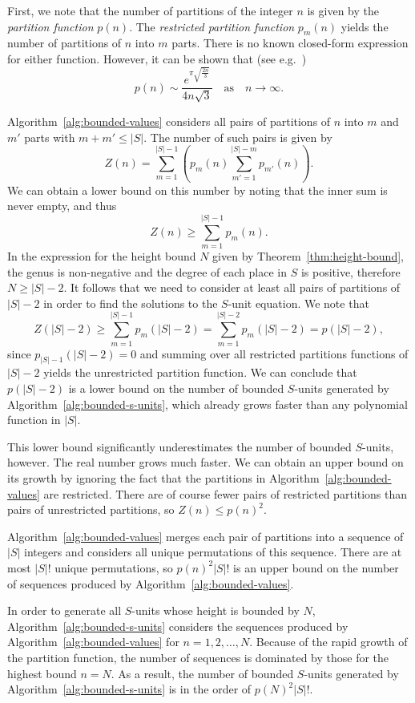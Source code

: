 First, we note that the number of partitions of the integer \(n\) is given by the \textit{partition function} \(p(n)\). The \textit{restricted partition function} \(p_{m}(n)\) yields the number of partitions of \(n\) into \(m\) parts. There is no known closed-form expression for either function. However, it can be shown that (see e.g.~\cite[Theorem 6.3]{andrews-1984-the-theory-of})
\[p(n) \sim \frac{e^{\pi\sqrt{\frac{2n}{3}}}}{4n\sqrt{3}} \quad \text{as} \quad n \to \infty.\]

Algorithm~\ref{alg:bounded-values} considers all pairs of partitions  of \(n\) into \(m\) and \(m'\) parts with \(m + m' \leq |S|\). The number of such pairs is given by
\[ Z(n) = \sum_{m = 1}^{|S| - 1} \left( p_{m}(n) \sum_{m' = 1}^{|S| - m} p_{m'}(n) \right).\]
We can obtain a lower bound on this number by noting that the inner sum is never empty, and thus
\[ Z(n) \geq \sum_{m = 1}^{|S| - 1} p_{m}(n).\]
In the expression for the height bound \(N\) given by Theorem~\ref{thm:height-bound}, the genus is non-negative and the degree of each place in \(S\) is positive, therefore \(N \geq |S| - 2\). It follows that we need to consider at least all pairs of partitions of \(|S| - 2\) in order to find the solutions to the \(S\)-unit equation. We note that
\[ Z(|S| - 2) \geq \sum_{m = 1}^{|S| - 1} p_{m}(|S| - 2) = \sum_{m = 1}^{|S| - 2} p_{m}(|S| - 2) = p(|S| - 2),\]
since \(p_{|S| - 1}(|S| - 2) = 0\) and summing over all restricted partitions functions of \(|S| - 2\) yields the unrestricted partition function. We can conclude that \(p(|S| - 2)\) is a lower bound on the number of bounded \(S\)-units generated by Algorithm~\ref{alg:bounded-s-units}, which already grows faster than any polynomial function in \(|S|\).

This lower bound significantly underestimates the number of bounded \(S\)-units, however. The real number grows much faster. We can obtain an upper bound on its growth by ignoring the fact that the partitions in Algorithm~\ref{alg:bounded-values} are restricted. There are of course fewer pairs of restricted partitions than pairs of unrestricted partitions, so \(Z(n) \leq {p(n)}^{2}\).

Algorithm~\ref{alg:bounded-values} merges each pair of partitions into a sequence of \(|S|\) integers and considers all unique permutations of this sequence. There are at most \(|S|!{}\) unique permutations, so \({p(n)}^{2}|S|!{}\) is an upper bound on the number of sequences produced by Algorithm~\ref{alg:bounded-values}.

In order to generate all \(S\)-units whose height is bounded by \(N\), Algorithm~\ref{alg:bounded-s-units} considers the sequences produced by Algorithm~\ref{alg:bounded-values} for \(n = 1, 2, \dots, N\). Because of the rapid growth of the partition function, the number of sequences is dominated by those for the highest bound \(n = N\). As a result, the number of bounded \(S\)-units generated by Algorithm~\ref{alg:bounded-s-units} is in the order of \({p(N)}^{2}|S|!{}\).

